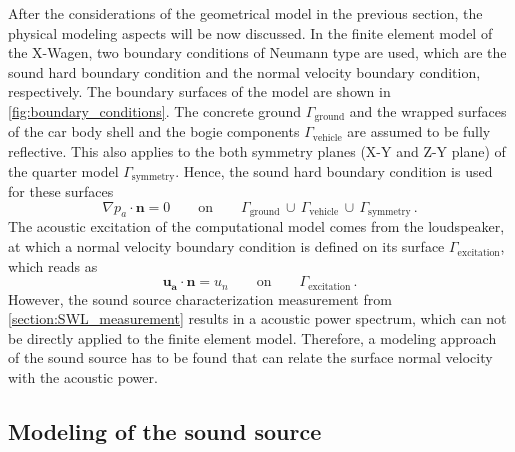 After the considerations of the geometrical model in the previous section, the physical modeling aspects will be now discussed. In the finite element model of the X-Wagen, two boundary conditions of Neumann type are used, which are the sound hard boundary condition and the normal velocity boundary condition, respectively. The boundary surfaces of the model are shown in \cref{fig:boundary_conditions}. The concrete ground $\Gamma_{\text{ground}}$ and the wrapped surfaces of the car body shell and the bogie components $\Gamma_{\text{vehicle}}$ are assumed to be fully reflective. This also applies to the both symmetry planes (X-Y and Z-Y plane) of the quarter model $\Gamma_{\text{symmetry}}$. Hence, the sound hard boundary condition is used for these surfaces
\begin{equation}
	\nabla p_a \cdot \boldsymbol{n} = 0\qquad\text{on}\qquad\Gamma_{\text{ground}}\,\cup\,\Gamma_{\text{vehicle}}\,\cup\,\Gamma_{\text{symmetry}}\,.
\end{equation}
The acoustic excitation of the computational model comes from the loudspeaker, at which a normal velocity boundary condition is defined on its surface $\Gamma_{\text{excitation}}$, which reads as
\begin{equation}
	\boldsymbol{u_a} \cdot \boldsymbol{n} = u_{n}\qquad\text{on}\qquad\Gamma_{\text{excitation}}\,.
\end{equation}
However, the sound source characterization measurement from \cref{section:SWL_measurement} results in a acoustic power spectrum, which can not be directly applied to the finite element model. Therefore, a modeling approach of the sound source has to be found that can relate the surface normal velocity with the acoustic power.

\subsection*{Modeling of the sound source}

